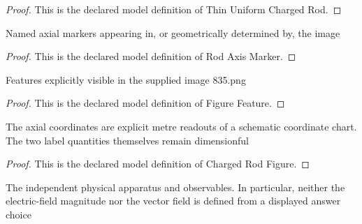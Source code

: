 \begin{proof}
  This is the declared model definition of Thin Uniform Charged Rod.
\end{proof}
\begin{definition}
  \label{def:physics:phyx-mini-0835:phyxminiproblems-problemphyxmini0835-rodaxismarker}
  Named axial markers appearing in, or geometrically determined by, the image
\end{definition}
\begin{proof}
  This is the declared model definition of Rod Axis Marker.
\end{proof}
\begin{definition}
  \label{def:physics:phyx-mini-0835:phyxminiproblems-problemphyxmini0835-figurefeature}
  Features explicitly visible in the supplied image 835.png
\end{definition}
\begin{proof}
  This is the declared model definition of Figure Feature.
\end{proof}
\begin{definition}
  \label{def:physics:phyx-mini-0835:phyxminiproblems-problemphyxmini0835-chargedrodfigure}
  The axial coordinates are explicit metre readouts of a schematic coordinate chart. The two label quantities themselves remain dimensionful
\end{definition}
\begin{proof}
  This is the declared model definition of Charged Rod Figure.
\end{proof}
\begin{definition}
  \label{def:physics:phyx-mini-0835:phyxminiproblems-problemphyxmini0835-axialchargedrodsetup}
  The independent physical apparatus and observables. In particular, neither the electric-field magnitude nor the vector field is defined from a displayed answer choice
\end{definition}
